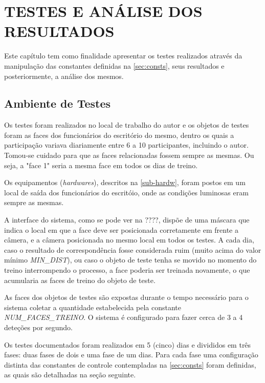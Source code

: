 
\chapter{TESTES E ANÁLISE DOS RESULTADOS}\label{ch:resultados}

Este capítulo tem como finalidade apresentar os testes realizados através da manipulação das constantes definidas na \autoref{sec:consts}, seus resultados e posteriormente, a análise dos mesmos.

\section{Ambiente de Testes}\label{sec:ambtest}

Os testes foram realizados no local de trabalho do autor e os objetos de testes foram as faces dos funcionários do escritório do mesmo, dentro os quais a participação variava diariamente entre 6 a 10 participantes, incluindo o autor. Tomou-se cuidado para que as faces relacionadas fossem sempre as mesmas. Ou seja, a "face 1" seria a mesma face em todos os dias de treino.

Os equipamentos (\textit{hardwares}), descritos na \autoref{sub-hardw}, foram postos em um local de saída dos funcionários do escritóio, onde as condições luminosas eram sempre as mesmas.

A interface do sistema, como se pode ver na ????, dispõe de uma máscara que indica o local em que a face deve ser posicionada corretamente em frente a câmera, e a câmera posicionada no mesmo local em todos os testes. A cada dia, caso o resultado de correspondência fosse considerada ruim (muito acima do valor mínimo \textit{MIN\_DIST}), ou caso o objeto de teste tenha se movido no momento do treino interrompendo o processo, a face poderia ser treinada novamente, o que acumularia as faces de treino do objeto de teste.

As faces dos objetos de testes são expostas durante o tempo necessário para o sistema coletar a quantidade estabelecida pela constante \textit{NUM\_FACES\_TREINO}. O sistema é configurado para fazer cerca de 3 a 4 deteções por segundo.

Os testes documentados foram realizados em 5 (cinco) dias e divididos em três fases: duas fases de dois e uma fase de um dias. Para cada fase uma configuração distinta das constantes de controle contempladas na \autoref{sec:consts} foram definidas, as quais são detalhadas na seção seguinte.

